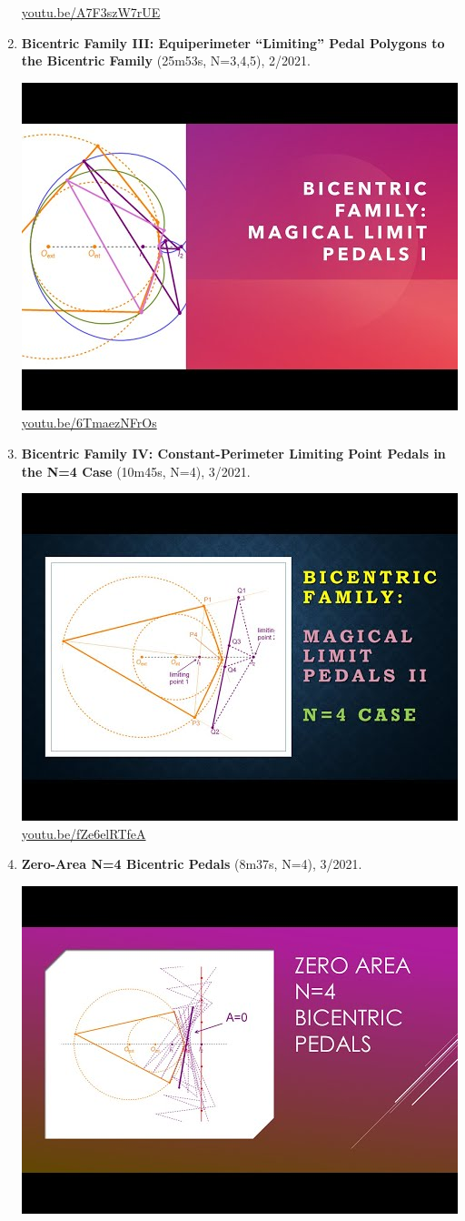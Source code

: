 \documentclass[12pt]{amsart}
\begin{document}
\begin{enumerate}[resume]
\begin{center}
\href{https://youtu.be/A7F3szW7rUE}{\url{youtu.be/A7F3szW7rUE}}\end{center}
% 
\item \textbf{Bicentric Family III: Equiperimeter ``Limiting'' Pedal Polygons to the Bicentric Family} (25m53s, N=3,4,5), 2/2021. 
\begin{center}\includegraphics[width=.5\textwidth]{pics/6TmaezNFrOs.jpg} \\ 
\href{https://youtu.be/6TmaezNFrOs}{\url{youtu.be/6TmaezNFrOs}}\end{center}
% 
\item \textbf{Bicentric Family IV: Constant-Perimeter Limiting Point Pedals in the N=4 Case} (10m45s, N=4), 3/2021. 
\begin{center}\includegraphics[width=.5\textwidth]{pics/fZe6elRTfeA.jpg} \\ 
\href{https://youtu.be/fZe6elRTfeA}{\url{youtu.be/fZe6elRTfeA}}\end{center}
% 
\item \textbf{Zero-Area N=4 Bicentric Pedals} (8m37s, N=4), 3/2021. 
\begin{center}\includegraphics[width=.5\textwidth]{pics/hwx1i-W6yLQ.jpg} \\ 

\end{center}
\end{enumerate}
\end{document}
